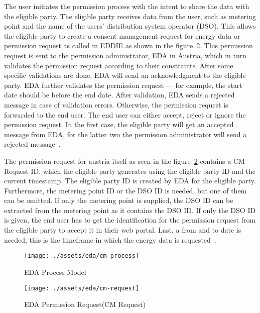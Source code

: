 The user initiates the permission process with the intent to share the data with the eligible party.
The eligible party receives data from the user, such as metering point and the name of the users' distribution system operator (DSO).
This allows the eligible party to create a consent management request for energy data or permission request as called in EDDIE as shown in the figure\ \ref{fig:eda-permission-request}.
This permission request is sent to the permission administrator, EDA in Austria, which in turn validates the permission request according to their constraints.
After some specific validations are done, EDA will send an acknowledgment to the eligible party.
EDA further validates the permission request — for example, the start date should be before the end date.
After validation, EDA sends a rejected message in case of validation errors.
Otherwise, the permission request is forwarded to the end user.
The end user can either accept, reject or ignore the permission request.
In the first case, the eligible party will get an accepted message from EDA, for the latter two the permission administrator will send a rejected message~\cite{eda, ebutilities}.

The permission request for austria itself as seen in the figure\ \ref{fig:eda-permission-request} contains a CM Request ID, which the eligible party generates using the eligible party ID and the current timestamp.
The eligible party ID is created by EDA for the eligible party.
Furthermore, the metering point ID or the DSO ID is needed, but one of them can be omitted.
If only the metering point is supplied, the DSO ID can be extracted from the metering point as it contains the DSO ID.
If only the DSO ID is given, the end user has to get the identification for the permission request from the eligible party to accept it in their web portal.
Last, a from and to date is needed; this is the timeframe in which the energy data is requested~\cite{ebutilities}.

\begin{figure}[h]
    \texttt{[image: ./assets/eda/cm-process]}
    \caption{EDA Process Model}
    \label{fig:eda-process-model}
\end{figure}

\begin{figure}[h]
    \texttt{[image: ./assets/eda/cm-request]}
    \caption{EDA Permission Request(CM Request)}
    \label{fig:eda-permission-request}
\end{figure}

